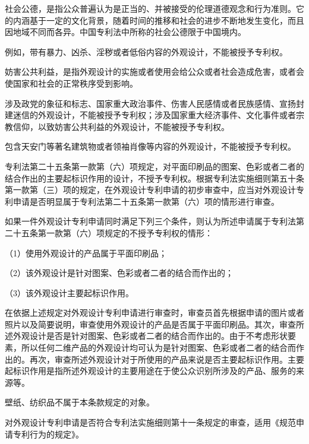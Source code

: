 社会公德，是指公众普遍认为是正当的、并被接受的伦理道德观念和行为准则。它的内涵基于一定的文化背景，随着时间的推移和社会的进步不断地发生变化，而且因地域不同而各异。中国专利法中所称的社会公德限于中国境内。

例如，带有暴力、凶杀、淫秽或者低俗内容的外观设计，不能被授予专利权。

妨害公共利益，是指外观设计的实施或者使用会给公众或者社会造成危害，或者会使国家和社会的正常秩序受到影响。

涉及政党的象征和标志、国家重大政治事件、伤害人民感情或者民族感情、宣扬封建迷信的外观设计，不能被授予专利权；涉及国家重大经济事件、文化事件或者宗教信仰，以致妨害公共利益的外观设计，不能被授予专利权。

包含天安门等著名建筑物或者领袖肖像等内容的外观设计，不能被授予专利权。

专利法第二十五条第一款第（六）项规定，对平面印刷品的图案、色彩或者二者的结合作出的主要起标识作用的设计，不授予专利权。根据专利法实施细则第五十条第一款第（三）项的规定，在外观设计专利申请的初步审查中，应当对外观设计专利申请是否明显属于专利法第二十五条第一款第（六）项的情形进行审查。

如果一件外观设计专利申请同时满足下列三个条件，则认为所述申请属于专利法第二十五条第一款第（六）项规定的不授予专利权的情形：

{\setlength{\parindent}{17.1bp}（1）使用外观设计的产品属于平面印刷品；\par}

{\setlength{\parindent}{17.1bp}（2）该外观设计是针对图案、色彩或者二者的结合而作出的；\par}

{\setlength{\parindent}{17.1bp}（3）该外观设计主要起标识作用。\par}

在依据上述规定对外观设计专利申请进行审查时，审查员首先根据申请的图片或者照片以及简要说明，审查使用外观设计的产品是否属于平面印刷品。其次，审查所述外观设计是否是针对图案、色彩或者二者的结合而作出的。由于不考虑形状要素，所以任何二维产品的外观设计均可认为是针对图案、色彩或者二者的结合而作出的。再次，审查所述外观设计对于所使用的产品来说是否主要起标识作用。主要起标识作用是指所述外观设计的主要用途在于使公众识别所涉及的产品、服务的来源等。

壁纸、纺织品不属于本条款规定的对象。

对外观设计专利申请是否符合专利法实施细则第十一条规定的审查，适用《规范申请专利行为的规定》。


